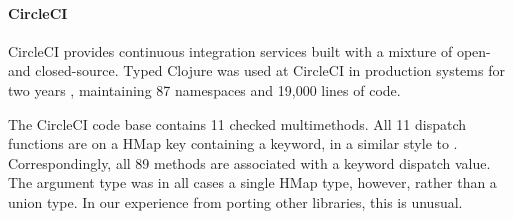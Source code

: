 \paragraph{CircleCI}
CircleCI %
provides continuous integration services built with a mixture of open-
and closed-source.
Typed Clojure was used at CircleCI in production systems for two years \cite{CircleCIUsesTC},
maintaining
87 namespaces and 19,000 lines of code.
%
%

%
%
%

The CircleCI code base contains 11 checked multimethods.
 All 11 dispatch functions
are on a HMap key containing a keyword, in a similar style to
.
Correspondingly, all 89 methods are associated with a keyword dispatch value.
The argument type was in all cases a single HMap type, however,
rather than a union type.
In our experience from porting other libraries, this is unusual.

